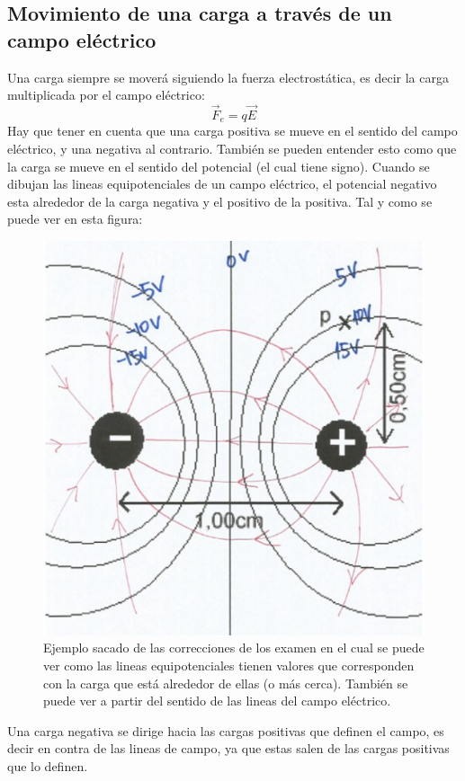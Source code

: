 \documentclass[arial,a4paper,print]{article}
\begin{document}
\subsection{Movimiento de una carga a través de un campo eléctrico}
Una carga siempre se moverá siguiendo la fuerza electrostática, es decir la carga multiplicada por el campo eléctrico:
\begin{equation*}
	\vec{F}_{e} = q\vec{E}
\end{equation*}
Hay que tener en cuenta que una carga positiva se mueve en el sentido del campo eléctrico, y una negativa al contrario. También se pueden entender esto como que la carga se mueve en el sentido del potencial (el cual tiene signo). Cuando se dibujan las lineas equipotenciales de un campo eléctrico, el potencial negativo esta alrededor de la carga negativa y el positivo de la positiva. Tal y como se puede ver en esta figura:
\begin{figure}[H]
	\centering
	\includegraphics[width=0.3\linewidth]{figures/ejemplo_sele}
	\caption{Ejemplo sacado de las correcciones de los examen en el cual se puede ver como las lineas equipotenciales tienen valores que corresponden con la carga que está alrededor de ellas (o más cerca). También se puede ver a partir del sentido de las lineas del campo eléctrico.}
	\label{fig:ejemplosele}
\end{figure}


Una carga negativa se dirige hacia las cargas positivas que definen el campo, es decir en contra de las lineas de campo, ya que estas salen de las cargas positivas que lo definen. 
\end{document}
